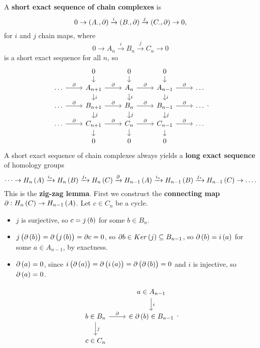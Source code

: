 A \textbf{short exact sequence of chain complexes} is
$$ 0 \to \br{A_\cdot, \partial} \xrightarrow{i} \br{B_\cdot, \partial} \xrightarrow{j} \br{C_\cdot, \partial} \to 0, $$
for $ i $ and $ j $ chain maps, where
$$ 0 \to A_n \xrightarrow{i} B_n \xrightarrow{j} C_n \to 0 $$
is a short exact sequence for all $ n $, so
$$
\begin{tikzcd}[row sep=small]
& 0 \arrow{d} & 0 \arrow{d} & 0 \arrow{d} & \\
\dots \arrow{r}{\partial} & A_{n + 1} \arrow{r}{\partial} \arrow{d}{i} & A_n \arrow{r}{\partial} \arrow{d}{i} & A_{n - 1} \arrow{r}{\partial} \arrow{d}{i} & \dots \\
\dots \arrow{r}{\partial} & B_{n + 1} \arrow{r}{\partial} \arrow{d}{j} & B_n \arrow{r}{\partial} \arrow{d}{j} & B_{n - 1} \arrow{r}{\partial} \arrow{d}{j} & \dots \\
\dots \arrow{r}{\partial} & C_{n + 1} \arrow{r}{\partial} \arrow{d} & C_n \arrow{r}{\partial} \arrow{d} & C_{n - 1} \arrow{r}{\partial} \arrow{d} & \dots \\
& 0 & 0 & 0 &
\end{tikzcd}.
$$
A short exact sequence of chain complexes always yields a \textbf{long exact sequence} of homology groups
$$ \dots \to H_n\br{A} \xrightarrow{i_*} H_n\br{B} \xrightarrow{j_*} H_n\br{C} \xrightarrow{\partial} H_{n - 1}\br{A} \xrightarrow{i_*} H_{n - 1}\br{B} \xrightarrow{j_*} H_{n - 1}\br{C} \to \dots. $$
This is the \textbf{zig-zag lemma}. First we construct the \textbf{connecting map} $ \partial : H_n\br{C} \to H_{n - 1}\br{A} $. Let $ c \in C_n $ be a cycle.
\begin{itemize}
\item $ j $ is surjective, so $ c = j\br{b} $ for some $ b \in B_n $.
\item $ j\br{\partial\br{b}} = \partial\br{j\br{b}} = \partial c = 0 $, so $ \partial b \in Ker\br{j} \subseteq B_{n - 1} $, so $ \partial\br{b} = i\br{a} $ for some $ a \in A_{n - 1} $, by exactness.
\item $ \partial\br{a} = 0 $, since $ i\br{\partial\br{a}} = \partial\br{i\br{a}} = \partial\br{\partial\br{b}} = 0 $ and $ i $ is injective, so $ \partial\br{a} = 0 $.
\end{itemize}
$$
\begin{tikzcd}
& a \in A_{n - 1} \arrow{d}{i} \\
b \in B_n \arrow{r}{\partial} \arrow{d}{j} & \in \partial\br{b} \in B_{n - 1} \\
c \in C_n &
\end{tikzcd}.
$$
